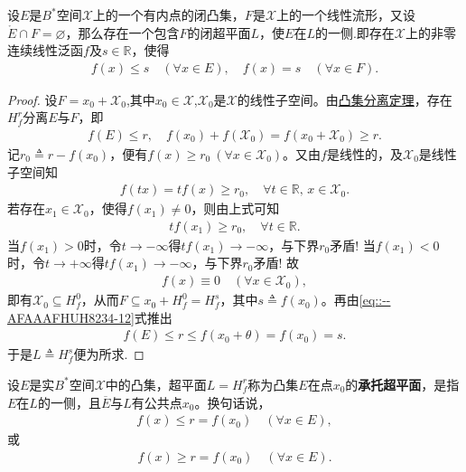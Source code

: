 \documentclass[../../main.tex]{subfiles}%
\begin{document}
\begin{corollary}[Mazur定理]\label{corollary:泛函分析--Mazur定理}
设$E$是$B^*$空间$\mathscr{X}$上的一个有内点的闭凸集，$F$是$\mathscr{X}$上的一个线性流形，又设$\mathring{E} \cap F = \varnothing$，那么存在一个包含$F$的闭超平面$L$，使$E$在$L$的一侧.即存在$\mathscr{X}$上的非零连续线性泛函$f$及$s \in \mathbb{R}$，使得
\begin{align*}
f(x) \leqslant s \quad (\forall x \in E), \quad f(x) = s \quad (\forall x \in F).
\end{align*}
\end{corollary}
\begin{proof}
设$F = x_0 + \mathscr{X}_0$,其中$x_0 \in \mathscr{X}$,$\mathscr{X}_0$是$\mathscr{X}$的线性子空间。由\hyperref[theorem:泛函分析--凸集分离定理]{凸集分离定理}，存在$H_f^r$分离$E$与$F$，即
\begin{align}
f(E)\leqslant r,\quad f\left( x_0 \right) +f\left( \mathscr{X} _0 \right) =f(x_0+\mathscr{X} _0)\geqslant r.
\label{eq::--AFAAAFHUH8234-12}
\end{align}
记$r_0 \triangleq r - f(x_0)$，便有$f(x) \geqslant r_0 \ (\forall x \in \mathscr{X}_0)$。又由$f$是线性的，及$\mathscr{X}_0$是线性子空间知
\begin{align*}
f(tx)=tf(x)\geqslant r_0,\quad \forall t\in\mathbb{R},\,x\in\mathscr{X}_0.
\end{align*}
若存在$x_1\in\mathscr{X}_0$，使得$f(x_1)\ne 0$，则由上式可知
\begin{align*}
tf(x_1)\geqslant r_0,\quad \forall t\in\mathbb{R}.
\end{align*}
当$f(x_1)>0$时，令$t\to-\infty$得$tf(x_1)\to-\infty$，与下界$r_0$矛盾! 当$f(x_1)<0$时，令$t\to+\infty$得$tf(x_1)\to-\infty$，与下界$r_0$矛盾!
故
\begin{align*}
f(x) \equiv 0 \quad (\forall x \in \mathscr{X}_0),
\end{align*}
即有$\mathscr{X}_0 \subseteq H_f^0$，从而$F \subseteq x_0 + H_f^0 = H_f^s$，其中$s \triangleq f(x_0)$。再由\eqref{eq::--AFAAAFHUH8234-12}式推出
\begin{align*}
f(E) \leqslant r\leqslant f(x_0+\theta)=f(x_0)=s.
\end{align*}
于是$L \triangleq H_f^s$便为所求.
\end{proof}

\begin{definition}[承托超平面]
设$E$是实$B^*$空间$\mathscr{X}$中的凸集，超平面$L = H_f^r$称为凸集$E$在点$x_0$的\textbf{承托超平面}，是指$E$在$L$的一侧，且$\overline{E}$与$L$有公共点$x_0$。换句话说，
\begin{align*}
f(x) \leqslant r = f(x_0) \quad (\forall x \in E),
\end{align*}
或
\begin{align*}
f(x) \geqslant r = f(x_0) \quad (\forall x \in E).
\end{align*}
\end{definition}
\end{document}
